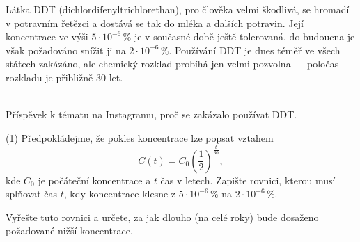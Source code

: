 \begin{exercise}

    \begin{minipage}[t]{0.68\textwidth}
        Látka DDT (dichlordifenyltrichlorethan), pro člověka velmi škodlivá, se hromadí 
        v potravním řetězci a dostává se tak do mléka a dalších potravin.
        Její koncentrace ve výši $5 \cdot 10^{-6}\,\%$ je v současné době ještě tolerovaná,
        do budoucna je však požadováno snížit ji na $2 \cdot 10^{-6}\,\%$.
        Používání DDT je dnes téměř ve všech státech zakázáno, ale chemický rozklad probíhá
        jen velmi pozvolna — poločas rozkladu je přibližně $30$ let.
    \end{minipage}
    \hfill
    \begin{minipage}[t]{0.28\textwidth}
        \begin{center}
          \smallskip
            \\[4pt]
            {\small Příspěvek k tématu na Instagramu, proč se zakázalo používat DDT.}
        \end{center}
    \end{minipage}

    \medskip

    \begin{tasks}(1)
        \task Předpokládejme, že pokles koncentrace lze popsat vztahem
        \[
            C(t) = C_0 \left(\frac{1}{2}\right)^{\frac{t}{30}},
        \]
        kde $C_0$ je počáteční koncentrace a $t$ čas v letech.  
        Zapište rovnici, kterou musí splňovat čas $t$, kdy koncentrace klesne z 
        $5 \cdot 10^{-6}\,\%$ na $2 \cdot 10^{-6}\,\%$.

        \task Vyřešte tuto rovnici a určete, za jak dlouho (na celé roky) 
        bude dosaženo požadované nižší koncentrace.
    \end{tasks}
\end{exercise}


